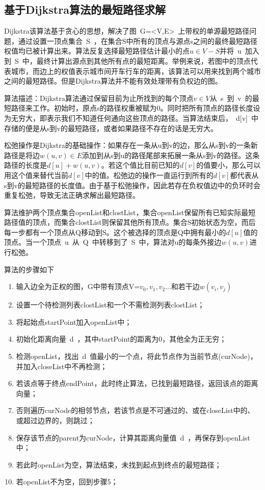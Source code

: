 \subsection{基于Dijkstra算法的最短路径求解}
\par Dijkstra该算法基于贪心的思想，解决了图~G=<V,E>~上带权的单源最短路径问题，通过设置一顶点集合~S~，在集合S中所有的顶点与源点s之间的最终最短路径权值均已被计算出来。算法反复选择最短路径估计最小的点$u\in V-S$并将~u~加入到~S~中，最终计算出源点到其他所有点的最短距离。举例来说，若图中的顶点代表城市，而边上的权值表示城市间开车行车的距离，该算法可以用来找到两个城市之间的最短路径。但是Dijkstra算法并不能有效处理带有负权边的图。
\par 算法描述：Dijkstra算法通过保留目前为止所找到的每个顶点$v\in V$从~s~到~v~的最短路径来工作。初始时，原点s的路径权重被赋为0。同时把所有顶点的路径长度设为无穷大，即表示我们不知道任何通向这些顶点的路径。当算法结束后，~d[v]~中存储的便是从s到v的最短路径，或者如果路径不存在的话是无穷大。
\par 松弛操作是Dijkstra的基础操作：如果存在一条从u到v的边，那么从s到v的一条新路径是将边$w(u,v)\in E$添加到从s到u的路径尾部来拓展一条从s到v的路径。这条路径的长度是$d[u]+w(u,v)$。若这个值比目前已知的$d[v]$的值要小，那么可以用这个值来替代当前$d[v]$中的值。松弛边的操作一直运行到所有的$d[v]$都代表从s到v的最短路径的长度值。由于基于松弛操作，因此若存在负权值边中的负环时会重复松弛，导致无法正确求解出最短路径。
\par 算法维护两个顶点集合openList和clostList，集合openList保留所有已知实际最短路径值的顶点，而集合clostList则保留其他所有顶点。集合S初始状态为空，而后每一步都有一个顶点从Q移动到S。这个被选择的顶点是Q中拥有最小的$d[u]$值的顶点。当一个顶点~u~从~Q~中转移到了~S~中，算法对u的每条外接边$w(u,v)$进行松弛。
\par 算法的步骤如下
\begin{enumerate}
    \item 输入边全为正权的图，G中带有顶点V=$v_0,v_1,v_2\dots$和若干边$w(v_i,v_j)$
    \item 设置一个待检测列表clostList和一个不需检测列表clostList；
    \item 将起始点startPoint加入openList中；
    \item 初始化距离向量~d~，其中startPoint的距离为0，其他全为正无穷；
    \item 检测openList，找出~d~值最小的一个点，将此节点作为当前节点(curNode)，并加入closeList中不再检测；
    \item 若该点等于终点endPoint，此时终止算法，已找到最短路径，返回该点的距离向量；
    \item 否则遍历curNode的相邻节点，若该节点是不可通过的、或在closeList中的、或超过边界的，则跳过；
    \item 保存该节点的parent为curNode，计算其距离向量值~d~，再保存到openList中；
    \item 若此时openList为空，算法结束，未找到起点到终点的最短路径；
    \item 若openList不为空，回到步骤5；
\end{enumerate}

